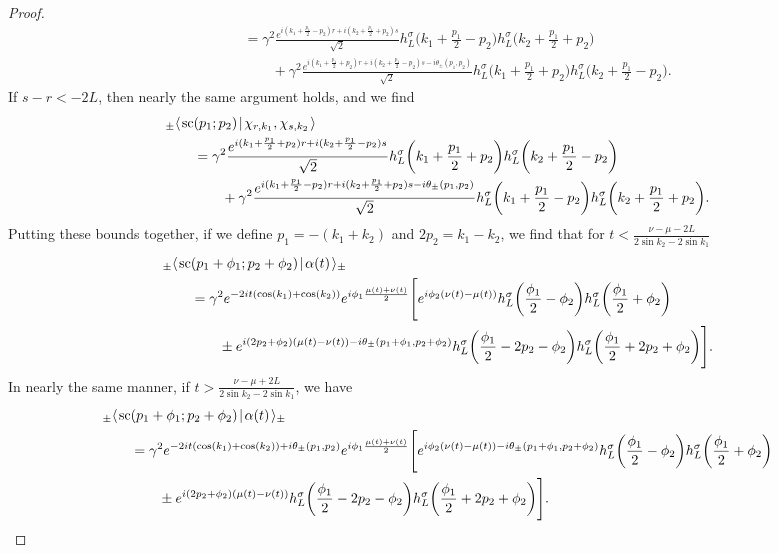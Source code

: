 \documentclass[../thesis-main/thesis-main]{subfiles}
\begin{document}
\begin{proof}
\begin{align}
   &\qquad = \gamma^2\frac{e^{i (k_1 + \frac{p_1}{2} - p_2) r + i (k_2 + \frac{p_1}{2} + p_2)s}}{\sqrt{2}} h_L^\sigma\bigg( k_1 + \frac{p_1}{2} - p_2\bigg) h_{L}^\sigma \bigg(k_2 + \frac{p_1}{2} + p_2\bigg)\nonumber\\
   &\qquad \qquad +\gamma^2 \frac{e^{i (k_1 + \frac{p_1}{2} + p_2) r + i (k_2 + \frac{p_1}{2} - p_2)s - i\theta_{\pm}(p_1,p_2)}}{\sqrt{2}} h_L^\sigma\bigg( k_1 + \frac{p_1}{2} + p_2\bigg) h_{L}^\sigma \bigg(k_2 + \frac{p_1}{2} - p_2\bigg).
\end{align}
If $s - r < -2L$, then nearly the same argument holds, and we find
\begin{align}
   &_{\pm}\langle\mspace{2mu} \text{sc}(p_1;p_2) \mspace{2mu} | \mspace{2mu} \chi_{r,k_1},\chi_{s,k_2}\mspace{2mu} \rangle\nonumber\\
   &\qquad = \gamma^2 \frac{e^{i (k_1 + \frac{p_1}{2} + p_2) r + i (k_2 + \frac{p_1}{2} - p_2)s}}{\sqrt{2}} h_L^\sigma\bigg( k_1 + \frac{p_1}{2} + p_2\bigg) h_{L}^\sigma \bigg(k_2 + \frac{p_1}{2} - p_2\bigg)\nonumber\\
   &\qquad \qquad +\gamma^2\frac{e^{i (k_1 + \frac{p_1}{2} - p_2) r + i (k_2 + \frac{p_1}{2} + p_2)s - i\theta_{\pm}(p_1,p_2)}}{\sqrt{2}} h_L^\sigma\bigg( k_1 + \frac{p_1}{2} - p_2\bigg) h_{L}^\sigma \bigg(k_2 + \frac{p_1}{2} + p_2\bigg).
\end{align}
Putting these bounds together, if we define $p_1 = -(k_1 + k_2)$ and $2 p_2 = k_1 - k_2$, we find that for $t < \frac{\nu - \mu - 2L}{2 \sin k_2 - 2 \sin k_1}$
\begin{align}
  &{}_{\pm}\langle\mspace{2mu} \text{sc}(p_1 + \phi_1 ; p_2 + \phi_2) \mspace{2mu} | \mspace{2mu} \alpha(t)\mspace{2mu} \rangle_{\pm} \nonumber\\
  &\qquad    = \gamma^2e^{-2 i  t (\cos(k_1) + \cos(k_2))} e^{i \phi_1\frac{\mu(t) + \nu(t)}{2}} \Bigg[e^{i \phi_2 (\nu(t) - \mu(t)) } h_{L}^\sigma \bigg(\frac{\phi_1}{2} - \phi_2\bigg) h_L^\sigma\bigg( \frac{\phi_1}{2} + \phi_2\bigg)\nonumber\\
  &\qquad\qquad \pm e^{ i (2 p_2+\phi_2)(\mu(t) - \nu(t)) - i \theta_{\pm}(p_1 + \phi_1, p_2+\phi_2)}h_L^\sigma\bigg(\frac{\phi_1}{2} - 2p_2 - \phi_2 \bigg) h_L^\sigma\bigg(\frac{\phi_1}{2} + 2 p_2 + \phi_2\bigg)\Bigg].
\end{align}
In nearly the same manner, if $ t > \frac{\nu - \mu + 2 L}{2 \sin k_2 - 2 \sin k_1}$, we have
\begin{align}
  &{}_{\pm}\langle\mspace{2mu} \text{sc}(p_1 + \phi_1 ; p_2 + \phi_2) \mspace{2mu} | \mspace{2mu} \alpha(t)\mspace{2mu} \rangle_{\pm} \nonumber\\
  &\qquad    = \gamma^2e^{-2 i  t (\cos(k_1) + \cos(k_2)) + i \theta_{\pm}(p_1,p_2)} e^{i\phi_1\frac{\mu(t) + \nu(t)}{2}} \Bigg[e^{i \phi_2 (\nu(t) - \mu(t)) - i \theta_{\pm}(p_1 + \phi_1, p_2+\phi_2) } h_{L}^\sigma \bigg(\frac{\phi_1}{2} - \phi_2\bigg) h_L^\sigma\bigg( \frac{\phi_1}{2} + \phi_2\bigg)\nonumber\\
  &\qquad\qquad \pm e^{ i (2 p_2+\phi_2)(\mu(t) - \nu(t)) }h_L^\sigma\bigg(\frac{\phi_1}{2} - 2p_2 - \phi_2 \bigg) h_L^\sigma\bigg(\frac{\phi_1}{2} + 2 p_2 + \phi_2\bigg)\Bigg].
\end{align}


\end{proof}
\end{document}
